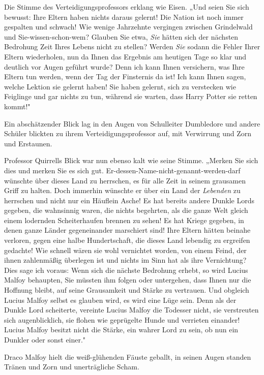 {Die Stimme des Verteidigungsprofessors erklang wie Eisen. „Und seien Sie sich bewusst: Ihre Eltern haben nichts daraus gelernt! Die Nation ist noch immer gespalten und schwach! Wie wenige Jahrzehnte vergingen zwischen Grindelwald und Sie-wissen-schon-wem? Glauben Sie etwa, \emph{Sie} hätten sich der nächsten Bedrohung Zeit Ihres Lebens nicht zu stellen? Werden \emph{Sie} sodann die Fehler Ihrer Eltern wiederholen, nun da Ihnen das Ergebnis am heutigen Tage so klar und deutlich vor Augen geführt wurde? Denn ich kann Ihnen versichern, was Ihre Eltern tun werden, wenn der Tag der Finsternis da ist! Ich kann Ihnen sagen, welche Lektion sie gelernt haben! Sie haben gelernt, sich zu verstecken wie Feiglinge und gar nichts zu tun, während sie warten, dass Harry Potter sie retten kommt!"

Ein abschätzender Blick lag in den Augen von Schulleiter Dumbledore und andere Schüler blickten zu ihrem Verteidigungsprofessor auf, mit Verwirrung und Zorn und Erstaunen.

Professor Quirrells Blick war nun ebenso kalt wie seine Stimme. „Merken Sie sich dies und merken Sie es sich gut. Er-dessen-Name-nicht-genannt-werden-darf wünschte über dieses Land zu herrschen, es für alle Zeit in seinem grausamen Griff zu halten. Doch immerhin wünschte er über ein Land der \emph{Lebenden} zu herrschen und nicht nur ein Häuflein Asche! Es hat bereits andere Dunkle Lords gegeben, die wahnsinnig waren, die nichts begehrten, als die ganze Welt gleich einem lodernden Scheiterhaufen brennen zu sehen! Es hat Kriege gegeben, in denen ganze Länder gegeneinander marschiert sind! Ihre Eltern hätten beinahe verloren, gegen eine halbe Hundertschaft, die dieses Land lebendig zu ergreifen gedachte! Wie schnell wären sie wohl vernichtet worden, von einem Feind, der ihnen zahlenmäßig überlegen ist und nichts im Sinn hat als ihre Vernichtung? Dies sage ich voraus: Wenn sich die nächste Bedrohung erhebt, so wird Lucius Malfoy behaupten, Sie müssten ihm folgen oder untergehen, dass Ihnen nur die Hoffnung bleibt, auf seine Grausamkeit und Stärke zu vertrauen. Und obgleich Lucius Malfoy selbst es glauben wird, es wird eine Lüge sein. Denn als der Dunkle Lord scheiterte, vereinte Lucius Malfoy die Todesser nicht, sie verstreuten sich augenblicklich, sie flohen wie geprügelte Hunde und verrieten einander! Lucius Malfoy besitzt nicht die Stärke, ein wahrer Lord zu sein, ob nun ein Dunkler oder sonst einer."

Draco Malfoy hielt die weiß-glühenden Fäuste geballt, in seinen Augen standen Tränen und Zorn und unerträgliche Scham.

}
